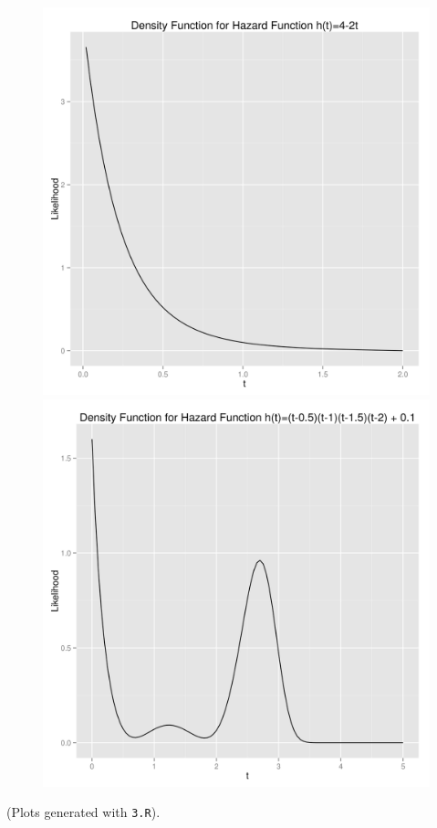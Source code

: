 \documentclass[letter]{article}
\begin{document}
\begin{figure}[H]
\centering
\includegraphics[scale=.33]{3_decreasing.png}
\includegraphics[scale=.33]{3_wshape.png}
\end{figure}
(Plots generated with \texttt{3.R}). 
\end{document}
